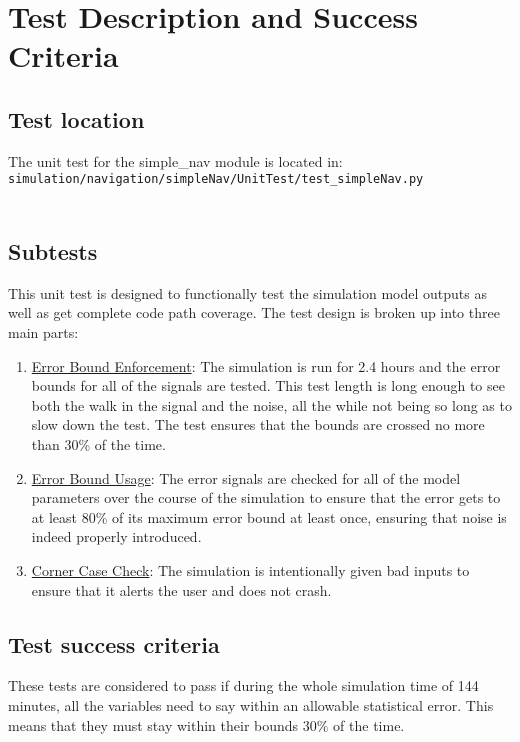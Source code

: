\section{Test Description and Success Criteria}


\subsection{Test location}

The unit test for the simple\_nav module is located in:\\

\noindent
{\tt simulation/navigation/simpleNav/UnitTest/test\_simpleNav.py} \\
\\

\subsection{Subtests}

\noindent This unit test is designed to functionally test the simulation model 
outputs as well as get complete code path coverage.  The test design is broken 
up into three main parts:\\
\begin{enumerate}
\item{\underline{Error Bound Enforcement}: The simulation is run for 2.4 hours and the 
   error bounds for all of the signals are tested. This test length is long enough to see both
   the walk in the signal and the noise, all the while not being so long as to slow down the test.
   The test ensures that the bounds are crossed no more than 30\% of the time.}
\item{\underline{Error Bound Usage}: The error signals are checked for all of the model 
   parameters over the course of the simulation to ensure that the error gets 
   to at least 80\% of its maximum error bound at least once, ensuring that noise is indeed
   properly introduced.}
\item{\underline{Corner Case Check}: The simulation is intentionally given bad inputs to 
   ensure that it alerts the user and does not crash.}
\end{enumerate}

\subsection{Test success criteria}

These tests are considered to pass if during the whole simulation time of 144 minutes,
all the variables need to say within an allowable statistical error. This means that they
must stay within their bounds $30\%$ of the time.

